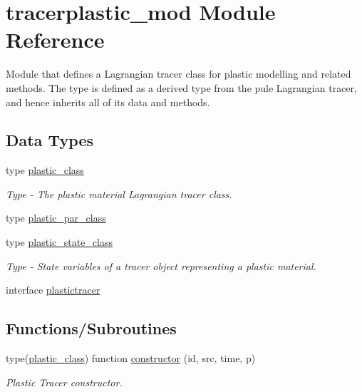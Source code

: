 \hypertarget{namespacetracerplastic__mod}{}\section{tracerplastic\+\_\+mod Module Reference}
\label{namespacetracerplastic__mod}


Module that defines a Lagrangian tracer class for plastic modelling and related methods. The type is defined as a derived type from the pule Lagrangian tracer, and hence inherits all of it\textquotesingle{}s data and methods.  


\subsection*{Data Types}
\begin{DoxyCompactItemize}
\item 
type \mbox{\hyperlink{structtracerplastic__mod_1_1plastic__class}{plastic\+\_\+class}}
\begin{DoxyCompactList}\small\item\em Type -\/ The plastic material Lagrangian tracer class. \end{DoxyCompactList}\item 
type \mbox{\hyperlink{structtracerplastic__mod_1_1plastic__par__class}{plastic\+\_\+par\+\_\+class}}
\item 
type \mbox{\hyperlink{structtracerplastic__mod_1_1plastic__state__class}{plastic\+\_\+state\+\_\+class}}
\begin{DoxyCompactList}\small\item\em Type -\/ State variables of a tracer object representing a plastic material. \end{DoxyCompactList}\item 
interface \mbox{\hyperlink{interfacetracerplastic__mod_1_1plastictracer}{plastictracer}}
\end{DoxyCompactItemize}
\subsection*{Functions/\+Subroutines}
\begin{DoxyCompactItemize}
\item 
type(\mbox{\hyperlink{structtracerplastic__mod_1_1plastic__class}{plastic\+\_\+class}}) function \mbox{\hyperlink{namespacetracerplastic__mod_ae68444b860b6e7abf3940b0ee1bfe57a}{constructor}} (id, src, time, p)
\begin{DoxyCompactList}\small\item\em Plastic Tracer constructor. \end{DoxyCompactList}\end{DoxyCompactItemize}


